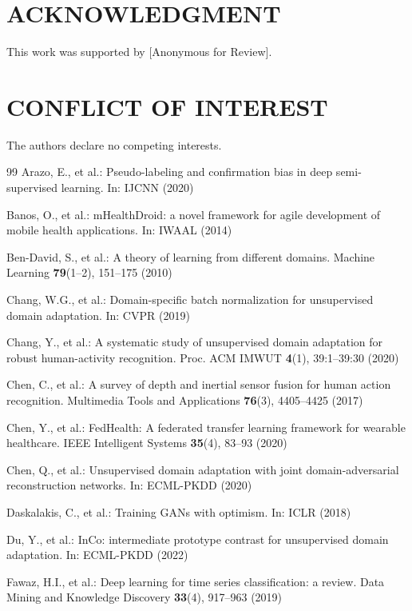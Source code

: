 \documentclass[conference]{IEEEtran}
\begin{document}
\section*{ACKNOWLEDGMENT}
This work was supported by [Anonymous for Review].

\section*{CONFLICT OF INTEREST}
The authors declare no competing interests.

\begin{thebibliography}{99}
Arazo, E., et al.: Pseudo-labeling and confirmation bias in deep semi-supervised learning. In: IJCNN (2020)

Banos, O., et al.: mHealthDroid: a novel framework for agile development of mobile health applications. In: IWAAL (2014)

Ben-David, S., et al.: A theory of learning from different domains. Machine Learning \textbf{79}(1--2), 151--175 (2010)

Chang, W.G., et al.: Domain-specific batch normalization for unsupervised domain adaptation. In: CVPR (2019)

Chang, Y., et al.: A systematic study of unsupervised domain adaptation for robust human-activity recognition. Proc. ACM IMWUT \textbf{4}(1), 39:1--39:30 (2020)

Chen, C., et al.: A survey of depth and inertial sensor fusion for human action recognition. Multimedia Tools and Applications \textbf{76}(3), 4405--4425 (2017)

Chen, Y., et al.: FedHealth: A federated transfer learning framework for wearable healthcare. IEEE Intelligent Systems \textbf{35}(4), 83--93 (2020)

Chen, Q., et al.: Unsupervised domain adaptation with joint domain-adversarial reconstruction networks. In: ECML-PKDD (2020)

Daskalakis, C., et al.: Training GANs with optimism. In: ICLR (2018)

Du, Y., et al.: InCo: intermediate prototype contrast for unsupervised domain adaptation. In: ECML-PKDD (2022)

Fawaz, H.I., et al.: Deep learning for time series classification: a review. Data Mining and Knowledge Discovery \textbf{33}(4), 917--963 (2019)


\end{thebibliography}
\end{document}
